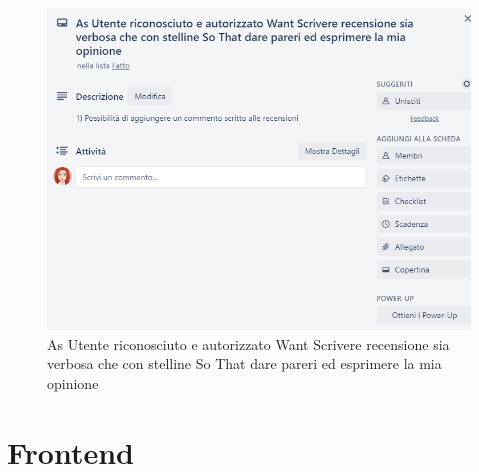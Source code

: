 \documentclass{article}[12pt]
\begin{document}
{{\begin{figure}
		\includegraphics[width=\columnwidth]{img/storia4.png}
		\caption{As Utente riconosciuto e autorizzato Want Scrivere recensione sia verbosa che con stelline So That dare pareri ed esprimere la mia opinione}
	\end{figure}
}\break

\section{Frontend}

}
\end{document}
